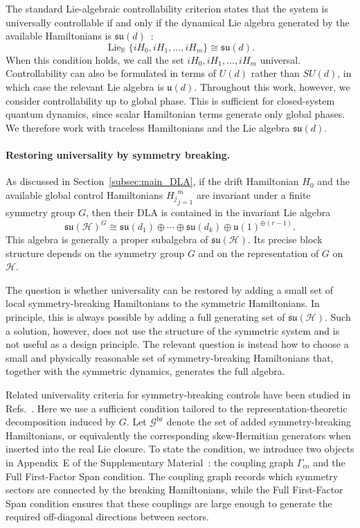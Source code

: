 \documentclass[10pt,twocolumn,superscriptaddress,aps,amsmath,amssymb,citeautoscript,floatfix,prx]{revtex4-2}
\newcounter{alg}
\theoremstyle{plain}
\theoremstyle{plain}
\theoremstyle{plain}
\theoremstyle{plain}
\theoremstyle{plain}
\theoremstyle{plain}
\begin{document}
The standard Lie-algebraic controllability criterion states that the system is universally controllable if and only if the dynamical Lie algebra generated by the available Hamiltonians is $\mathfrak{su}(d)$~\cite{Albertini2003}:
$$
\operatorname{Lie}_{\mathbb R}
\{iH_0,iH_1,\ldots,iH_m\}
\cong
\mathfrak{su}(d).
$$
When this condition holds, we call the set ${iH_0,iH_1,\ldots,iH_m}$ universal. Controllability can also be formulated in terms of $U(d)$ rather than $SU(d)$, in which case the relevant Lie algebra is $\mathfrak{u}(d)$. Throughout this work, however, we consider controllability up to global phase. This is sufficient for closed-system quantum dynamics, since scalar Hamiltonian terms generate only global phases. We therefore work with traceless Hamiltonians and the Lie algebra $\mathfrak{su}(d)$.

\paragraph{Restoring universality by symmetry breaking.}

As discussed in Section~\ref{subsec:main_DLA}, if the drift Hamiltonian $H_0$ and the available global control Hamiltonians ${H_j}_{j=1}^m$ are invariant under a finite symmetry group $G$, then their DLA is contained in the invariant Lie algebra
$$
\mathfrak{su}(\mathcal H)^G
\cong
\mathfrak{su}(d_1)
\oplus
\cdots
\oplus
\mathfrak{su}(d_k)
\oplus
\mathfrak{u}(1)^{\oplus(r-1)}.
$$
This algebra is generally a proper subalgebra of $\mathfrak{su}(\mathcal H)$. Its precise block structure depends on the symmetry group $G$ and on the representation of $G$ on $\mathcal H$.

The question is whether universality can be restored by adding a small set of local symmetry-breaking Hamiltonians to the symmetric Hamiltonians. In principle, this is always possible by adding a full generating set of $\mathfrak{su}(\mathcal H)$. Such a solution, however, does not use the structure of the symmetric system and is not useful as a design principle. The relevant question is instead how to choose a small and physically reasonable set of symmetry-breaking Hamiltonians that, together with the symmetric dynamics, generates the full algebra.

Related universality criteria for symmetry-breaking controls have been studied in Refs.~\cite{Hu2025, AlbertiniDAlessandro2025}. Here we use a sufficient condition tailored to the representation-theoretic decomposition induced by $G$. Let $\mathcal G^{\mathrm{br}}$ denote the set of added symmetry-breaking Hamiltonians, or equivalently the corresponding skew-Hermitian generators when inserted into the real Lie closure. To state the condition, we introduce two objects in Appendix~E of the Supplementary Material~\cite{SuppMat}: the coupling graph $\Gamma_{\mathrm{co}}$ and the Full First-Factor Span condition. The coupling graph records which symmetry sectors are connected by the breaking Hamiltonians, while the Full First-Factor Span condition ensures that these couplings are large enough to generate the required off-diagonal directions between sectors.
\end{document}
